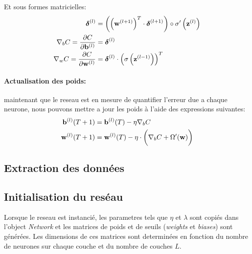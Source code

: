 \documentclass[11pt]{article}
\begin{document}
Et sous formes matricielles:
\begin{equation}
	\begin{aligned}
		\boldsymbol \delta^{(l)} &= \left(\left({\bf w}^{(l+1)} \right)^{T}
		\cdot \boldsymbol \delta^{(l+1)} \right)
		\circ \sigma'\left( {\bf z}^{(l)}\right) \\
		\nabla_bC = \frac{\partial C}{\partial {\bf b}^{(l)}} &=
		\boldsymbol\delta^{(l)}  \\
		\nabla_wC = \frac{\partial C}{\partial {\bf w}^{(l)}} &=
		\boldsymbol\delta^{(l)} \cdot \left(\sigma\left({\bf z}^{(l-1)}\right)\right)^{T}\\
	\end{aligned}
\end{equation}

\paragraph{Actualisation des poids:} maintenant que le reseau est en mesure de
quantifier l'erreur due a chaque neurone, nous pouvons mettre a jour les poids
\`a l'aide des expressions suivantes:
\begin{equation}
	\begin{aligned}
		{\bf b}^{(l)}(T+1) &= {\bf b}^{(l)}(T) - \eta \nabla_bC \\
		{\bf w}^{(l)}(T+1) &= {\bf w}^{(l)}(T) - \eta \cdot \bigg( \nabla_bC + \Omega'({\bf w})\bigg)\\
	\end{aligned}
\end{equation}



\subsection{Extraction des donn\'ees}


\subsection{Initialisation du res\'eau}
Lorsque le reseau est instanci\'e, les parametres tels que $\eta$ et $\lambda$
sont copi\'es dans l'object
\emph{Network} et les matrices de poids et de seuils (\emph{weights} et
\emph{biases}) sont g\'en\'er\'ees. Les dimensions de ces matrices sont
determin\'ees en fonction du nombre de neurones sur chaque couche et du nombre
de couches $L$.
\end{document}
